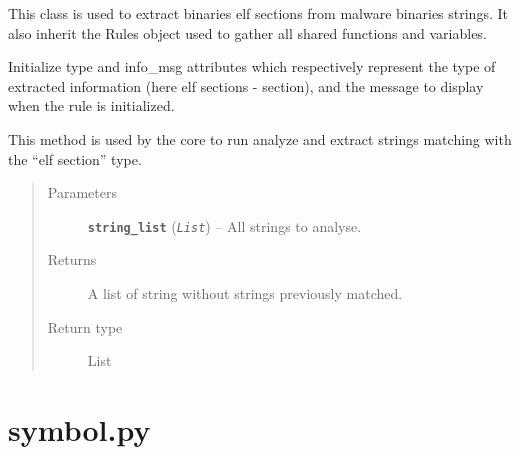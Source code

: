 \documentclass[letterpaper,10pt,oneside]{sphinxmanual}
\begin{document}
\begin{fulllineitems}
\label{index:lib.allRules.section.Section}
This class is used to extract binaries elf sections from malware
binaries strings. It also inherit the Rules object used to gather
all shared functions and variables.

\begin{fulllineitems}
\label{index:lib.allRules.section.Section.__init__}
Initialize type and info\_msg attributes which respectively represent
the type of extracted information (here elf sections - section),
and the message to display when the rule is initialized.

\end{fulllineitems}


\begin{fulllineitems}
\label{index:lib.allRules.section.Section.run_analysis}
This method is used by the core to run analyze and extract strings
matching with the ``elf section'' type.
\begin{quote}\begin{description}
\item[{Parameters}] \leavevmode
\textbf{\texttt{string\_list}} (\emph{\texttt{List}}) -- All strings to analyse.

\item[{Returns}] \leavevmode
A list of string without strings previously matched.

\item[{Return type}] \leavevmode
List

\end{description}\end{quote}

\end{fulllineitems}


\end{fulllineitems}



\section{symbol.py}
\label{index:symbol-py}\label{index:module-lib.allRules.symbol}
\end{document}
